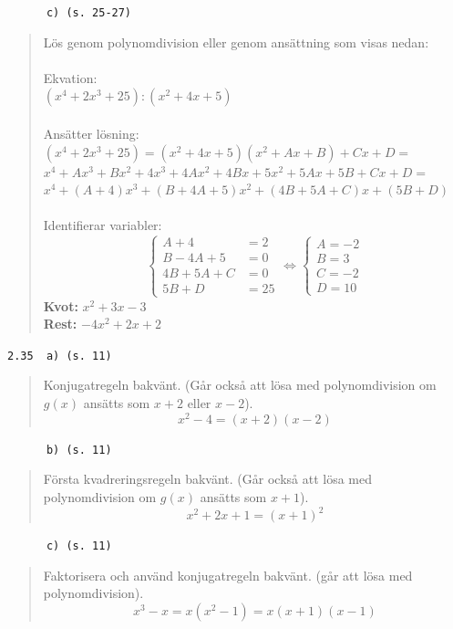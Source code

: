 \documentclass[a4paper]{article}
\newcommand{\tskcol}[1]{\textcolor{tskcol}{#1}}
\begin{document}
	\pagebreak
	\texttt{\tskcol{~~~~~~c) (s. 25-27)}}
	\begin{quotation}
		\noindent
		Lös genom polynomdivision eller genom ansättning som visas nedan: \\ \\
		Ekvation: \\
		$(x^4+2x^3+25):(x^2+4x+5)$ \\ \\
		Ansätter lösning: \\
		$(x^4+2x^3+25)=(x^2+4x+5)(x^2+Ax+B)+Cx+D=$ \\
		$x^4+Ax^3+Bx^2+4x^3+4Ax^2+4Bx+5x^2+5Ax+5B+Cx+D=$ \\
		$x^4+(A+4)x^3+(B+4A+5)x^2+(4B+5A+C)x+(5B+D)$ \\ \\
		Identifierar variabler:\\
		\[\begin{cases} 
		A+4&=2 \\ 
		B-4A+5&=0 \\ 
		4B+5A+C&=0 \\
		5B+D&=25
		\end{cases}
		\Leftrightarrow
		\begin{cases} 
		A=-2 \\ 
		B=3 \\
		C=-2 \\
		D=10
		\end{cases}\]
		\textbf{Kvot:} $x^2+3x-3$ \\
		\textbf{Rest:} $-4x^2+2x+2$
	\end{quotation}
	
	\texttt{\tskcol{2.35~~a) (s. 11)}}
	\begin{quotation}
		\noindent
		Konjugatregeln bakvänt. (Går också att lösa med polynomdivision om $g(x)$ ansätts som $x+2$ eller $x-2$).
		\[x^2-4=(x+2)(x-2)\]
	\end{quotation}
	
	\texttt{\tskcol{~~~~~~b) (s. 11)}}
	\begin{quotation}
		\noindent
		Första kvadreringsregeln bakvänt. (Går också att lösa med polynomdivision om $g(x)$ ansätts som $x+1$).
		\[x^2+2x+1=(x+1)^2\]
	\end{quotation}
	
	\texttt{\tskcol{~~~~~~c) (s. 11)}}
	\begin{quotation}
		\noindent
		Faktorisera och använd konjugatregeln bakvänt. (går att lösa med polynomdivision).
		\[x^3-x=x(x^2-1)=x(x+1)(x-1)\]
	\end{quotation}
	
\end{document}
